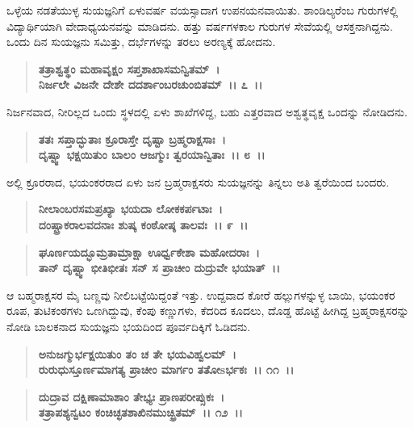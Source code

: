 ಒಳ್ಳೆಯ ನಡತೆಯುಳ್ಳ ಸುಯಜ್ಞನಿಗೆ ಏಳುವರ್ಷ ವಯಸ್ಸಾದಾಗ ಉಪನಯನ\-ವಾಯಿತು. ಶಾಂಡಿಲ್ಯರೆಂಬ ಗುರುಗಳಲ್ಲಿ ವಿದ್ಯಾರ್ಥಿಯಾಗಿ ವೇದಾಧ್ಯಯನವನ್ನು ಮಾಡಿದನು. ಹತ್ತು ವರ್ಷಗಳಕಾಲ ಗುರುಗಳ ಸೇವೆಯಲ್ಲಿ ಆಸಕ್ತನಾಗಿದ್ದನು. ಒಂದು ದಿನ ಸುಯಜ್ಞನು ಸಮಿತ್ತು, ದರ್ಭೆಗಳನ್ನು ತರಲು ಅರಣ್ಯಕ್ಕೆ ಹೋದನು.

\begin{verse}
\textbf{ತತ್ರಾಶ್ವತ್ಥಂ ಮಹಾವೃಕ್ಷಂ ಸಪ್ತಶಾಖಾಸಮನ್ವಿತಮ್~।}\\\textbf{ನಿರ್ಜಲೇ ವಿಜನೇ ದೇಶೇ ದದರ್ಶಾಂಬರಚುಂಬಿತಮ್~।। ೭~।।}
\end{verse}

ನಿರ್ಜನವಾದ, ನೀರಿಲ್ಲದ ಒಂದು ಸ್ಥಳದಲ್ಲಿ ಏಳು ಶಾಖೆಗಳಿದ್ದ, ಬಹು ಎತ್ತರವಾದ ಅಶ್ವತ್ಥವೃಕ್ಷ ಒಂದನ್ನು ನೋಡಿದನು.

\begin{verse}
\textbf{ತತಃ ಸಪ್ತಾದ್ಭುತಾಃ ಕ್ರೂರಾಸ್ತೇ ದೃಷ್ಟಾ ಬ್ರಹ್ಮರಾಕ್ಷಸಾಃ~।}\\\textbf{ದೃಷ್ಟ್ವಾ ಭಕ್ಷಯಿತುಂ ಬಾಲಂ ಆಜಗ್ಮುಃ ತ್ವರಯಾನ್ವಿತಾಃ~।। ೮~।।}
\end{verse}

ಅಲ್ಲಿ ಕ್ರೂರರಾದ, ಭಯಂಕರರಾದ ಏಳು ಜನ ಬ್ರಹ್ಮರಾಕ್ಷಸರು ಸುಯಜ್ಞನನ್ನು ತಿನ್ನಲು ಅತಿ ತ್ವರೆಯಿಂದ ಬಂದರು.

\begin{verse}
\textbf{ನೀಲಾಂಬರಸಮಪ್ರಖ್ಯಾ ಭಯದಾ ಲೋಕಕರ್ಪಟಾಃ~।}\\\textbf{ದಂಷ್ಟ್ರಾಕರಾಲವದನಾಃ ಶುಷ್ಕ ಕಂಠೋಷ್ಠ ತಾಲವಃ~।। ೯~।।} 
\end{verse}

\begin{verse}
\textbf{ಘೂರ್ಣಯದ್ಭೂಮ್ರತಾಮ್ರಾಕ್ಷಾ ಊರ್ಧ್ವಕೇಶಾ ಮಹೋದರಾಃ~।}\\\textbf{ತಾನ್ ದೃಷ್ಟ್ವಾ ಭೀತಿಭೀತಃ ಸನ್ ಸ ಪ್ರಾಚೀಂ ದುದ್ರುವೇ ಭಯಾತ್~।।}
\end{verse}

ಆ ಬಹ್ಮರಾಕ್ಷಸರ ಮೈ ಬಣ್ಣವು ನೀಲಿಬಟ್ಟೆಯಿದ್ದಂತೆ ಇತ್ತು. ಉದ್ದವಾದ ಕೋರೆ ಹಲ್ಲುಗಳನ್ನುಳ್ಳ ಬಾಯಿ, ಭಯಂಕರ ರೂಪ, ತುಟಿಕಂಠಗಳು ಒಣಗಿದ್ದುವು, ಕೆಂಪು ಕಣ್ಣುಗಳು, ಕೆದರಿದ ಕೂದಲು, ದೊಡ್ಡ ಹೊಟ್ಟೆ ಹೀಗಿದ್ದ ಬ್ರಹ್ಮರಾಕ್ಷಸರನ್ನು ನೋಡಿ ಬಾಲಕನಾದ ಸುಯಜ್ಞನು ಭಯದಿಂದ ಪೂರ್ವದಿಕ್ಕಿಗೆ ಓಡಿದನು.

\begin{verse}
\textbf{ಅನುಜಗ್ಮುರ್ಭಕ್ಷಯಿತುಂ ತಂ ಚ ತೇ ಭಯವಿಹ್ವಲಮ್~।}\\\textbf{ರುರುಧುಸ್ತೂರ್ಣಮಾಗತ್ಯ ಪ್ರಾಚೀಂ ಮಾರ್ಗಂ ತತೋsರ್ಭಕಃ~।। ೧೧~।। }
\end{verse}

\begin{verse}
\textbf{ದುದ್ರಾವ ದಕ್ಷಿಣಾಮಾಶಾಂ ತೇಭ್ಯಃ ಪ್ರಾಣಪರೀಪ್ಸುಕಃ~।}\\\textbf{ತತ್ರಾಪಶ್ಯನ್ವಟಂ ಕಂಚಿಚ್ಛತಶಾಖಿನಮುಚ್ಛ್ರಿತಮ್~।। ೧೨~।। }
\end{verse}

